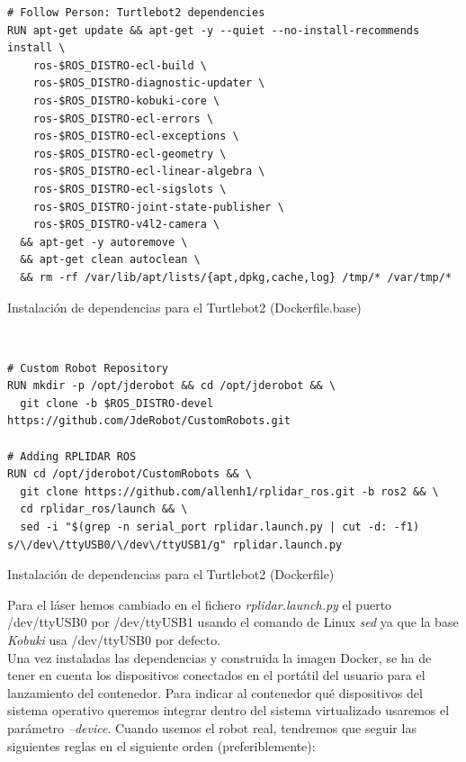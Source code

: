 \begin{code}[H]
\begin{lstlisting}
# Follow Person: Turtlebot2 dependencies
RUN apt-get update && apt-get -y --quiet --no-install-recommends install \
    ros-$ROS_DISTRO-ecl-build \
    ros-$ROS_DISTRO-diagnostic-updater \
    ros-$ROS_DISTRO-kobuki-core \
    ros-$ROS_DISTRO-ecl-errors \
    ros-$ROS_DISTRO-ecl-exceptions \
    ros-$ROS_DISTRO-ecl-geometry \
    ros-$ROS_DISTRO-ecl-linear-algebra \
    ros-$ROS_DISTRO-ecl-sigslots \
    ros-$ROS_DISTRO-joint-state-publisher \
    ros-$ROS_DISTRO-v4l2-camera \
  && apt-get -y autoremove \
  && apt-get clean autoclean \
  && rm -rf /var/lib/apt/lists/{apt,dpkg,cache,log} /tmp/* /var/tmp/*
\end{lstlisting}
\caption{Instalación de dependencias para el Turtlebot2 (Dockerfile.base)}
\label{fig:instalacion_dependencias_turtlebot2_dockerfile_base}
\end{code}\

\begin{code}[H]
\begin{lstlisting}
# Custom Robot Repository
RUN mkdir -p /opt/jderobot && cd /opt/jderobot && \
  git clone -b $ROS_DISTRO-devel https://github.com/JdeRobot/CustomRobots.git

# Adding RPLIDAR ROS
RUN cd /opt/jderobot/CustomRobots && \
  git clone https://github.com/allenh1/rplidar_ros.git -b ros2 && \
  cd rplidar_ros/launch && \
  sed -i "$(grep -n serial_port rplidar.launch.py | cut -d: -f1) s/\/dev\/ttyUSB0/\/dev\/ttyUSB1/g" rplidar.launch.py
\end{lstlisting}
\caption{Instalación de dependencias para el Turtlebot2 (Dockerfile)}
\label{fig:instalacion_dependencias_turtlebot2_dockerfile}
\end{code}

Para el láser hemos cambiado en el fichero \textit{rplidar.launch.py} el puerto /dev/ttyUSB0 por /dev/ttyUSB1 usando el comando de Linux \textit{sed} ya que la base \textit{Kobuki} usa /dev/ttyUSB0 por defecto.\\

Una vez instaladas las dependencias y construida la imagen Docker, se ha de tener en cuenta los dispositivos conectados en el portátil del usuario para el lanzamiento del contenedor. Para indicar al contenedor qué dispositivos del sistema operativo queremos integrar dentro del sistema virtualizado usaremos el parámetro \textit{--device}. Cuando usemos el robot real, tendremos que seguir las siguientes reglas en el siguiente orden (preferiblemente):\\

